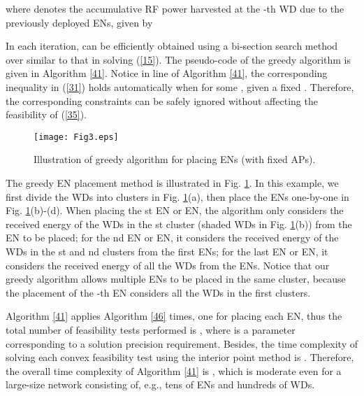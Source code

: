 \documentclass[journal, draftcls, one column, 12pt]{IEEEtran}
\begin{document}
where  denotes the accumulative RF power harvested at the -th WD due to the  previously deployed ENs, given by

In each iteration,  can be efficiently obtained using a bi-section search method over  similar to that in solving (\ref{15}). The pseudo-code of the greedy algorithm is given in Algorithm \ref{41}. Notice in line  of Algorithm \ref{41}, the corresponding inequality in (\ref{31}) holds automatically when  for some , given a fixed . Therefore, the corresponding constraints can be safely ignored without affecting the feasibility of (\ref{35}).

\begin{figure}
\centering
  \begin{center}
    \texttt{[image: Fig3.eps]}
  \end{center}
  \caption{Illustration of greedy algorithm for placing  ENs (with fixed APs).}
  \label{63}
\end{figure}

The greedy EN placement method is illustrated in Fig. \ref{63}. In this example, we first divide the WDs into  clusters in Fig. \ref{63}(a), then place the  ENs one-by-one in Fig. \ref{63}(b)-(d). When placing the st EN or EN, the algorithm only considers the received energy of the WDs in the st cluster (shaded WDs in Fig. \ref{63}(b)) from the EN to be placed; for the nd EN or EN, it considers the received energy of the WDs in the st and nd clusters from the first  ENs; for the last EN or EN, it considers the received energy of all the WDs from the  ENs. Notice that our greedy algorithm allows multiple ENs to be placed in the same cluster, because the placement of the -th EN considers all the WDs in the first  clusters.

Algorithm \ref{41} applies Algorithm \ref{46}  times, one for placing each EN, thus the total number of feasibility tests performed is , where  is a parameter corresponding to a solution precision requirement. Besides, the time complexity of solving each convex feasibility test using the interior point method is \cite{2004:Boyd}. Therefore, the overall time complexity of Algorithm \ref{41} is , which is moderate even for a large-size network consisting of, e.g., tens of ENs and hundreds of WDs.
\end{document}
